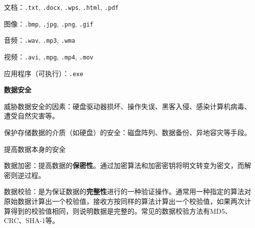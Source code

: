 \begin{compactenum}[1.]
	\begin{compactitem}
	\item  文档：\texttt{.txt}, \texttt{.docx}, \texttt{.wps}, \texttt{.html},  \texttt{.pdf}
	\item  图像：\texttt{.bmp}, \texttt{.jpg}, \texttt{.png}, \texttt{.gif}
	\item  音频：\texttt{.wav}, \texttt{.mp3}, \texttt{.wma}
	\item  视频：\texttt{.avi}, \texttt{.mpg}, \texttt{.mp4}, \texttt{.mov}
	\item  应用程序（可执行）：\texttt{.exe}
	\end{compactitem}

\item \textbf{数据安全}

	\begin{compactitem}
	\item  威胁数据安全的因素：硬盘驱动器损坏、操作失误、黑客入侵、感染计算机病毒、遭受自然灾害等。
	\item  保护存储数据的介质（如硬盘）的安全：磁盘阵列、数据备份、异地容灾等手段。
	\item  提高数据本身的安全

	  \begin{compactitem}  
	  \item    数据加密：提高数据的\textbf{保密性}。通过加密算法和加密密钥将明文转变为密文，而解密则逆过程。
	  \item    数据校验：是为保证数据的\textbf{完整性}进行的一种验证操作。通常用一种指定的算法对原始数据计算出一个校验值，接收方按同样的算法计算出一个校验值，如果两次计算得到的校验值相同，则说明数据是完整的。常见的数据校验方法有MD5、CRC、SHA-1等。
	  \end{compactitem}
	\end{compactitem}


\end{compactenum}%


